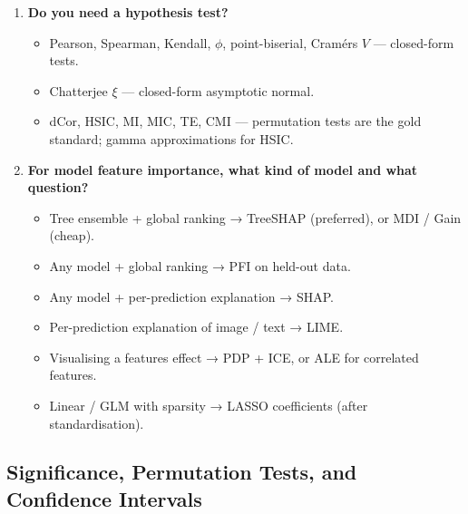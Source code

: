 \documentclass{article}
\providecommand{\tightlist}{\setlength{\itemsep}{0pt}\setlength{\parskip}{0pt}}
\begin{document}
\begin{enumerate}
  \begin{itemize}
  \tightlist
  \item
    Linear → Pearson.
  \item
    Monotone → Spearman, Kendall.
  \item
    Functional non-monotone → Chatterjee \(\xi\), dCor, HSIC, MI.
  \item
    Anything → MI, dCor, HSIC.
  \end{itemize}
\item
  \textbf{Do you need a hypothesis test?}

  \begin{itemize}
  \tightlist
  \item
    Pearson, Spearman, Kendall, \(\phi\), point-biserial,
    Cramér\textquotesingle s \(V\) --- closed-form tests.
  \item
    Chatterjee \(\xi\) --- closed-form asymptotic normal.
  \item
    dCor, HSIC, MI, MIC, TE, CMI --- permutation tests are the gold
    standard; gamma approximations for HSIC.
  \end{itemize}
\item
  \textbf{For model feature importance, what kind of model and what
  question?}

  \begin{itemize}
  \tightlist
  \item
    Tree ensemble + global ranking → TreeSHAP (preferred), or MDI / Gain
    (cheap).
  \item
    Any model + global ranking → PFI on held-out data.
  \item
    Any model + per-prediction explanation → SHAP.
  \item
    Per-prediction explanation of image / text → LIME.
  \item
    Visualising a feature\textquotesingle s effect → PDP + ICE, or ALE
    for correlated features.
  \item
    Linear / GLM with sparsity → LASSO coefficients (after
    standardisation).
  \end{itemize}
\end{enumerate}

\subsection{Significance, Permutation Tests, and Confidence
Intervals}\label{significance-permutation-tests-and-confidence-intervals}
\end{document}
